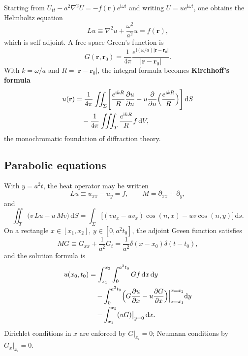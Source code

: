 \begin{example}
Starting from $U_{tt}-a^2\nabla^2 U=-f(\mathbf{r})e^{\mathrm{i}\omega t}$ and writing $U=ue^{\mathrm{i}\omega t}$, one obtains the Helmholtz equation
\begin{equation}
Lu\equiv\nabla^2 u+\frac{\omega^2}{a^2}u=f(\mathbf{r}),
\end{equation}
which is self-adjoint. A free-space Green's function is
\begin{equation}
G(\mathbf{r},\mathbf{r}_0)=\frac{1}{4\pi}\frac{e^{\mathrm{i}(\omega/a)|\mathbf{r}-\mathbf{r}_0|}}{|\mathbf{r}-\mathbf{r}_0|}.
\end{equation}
With $k=\omega/a$ and $R=|\mathbf{r}-\mathbf{r}_0|$, the integral formula becomes \textbf{Kirchhoff's formula}
\begin{equation}
\begin{aligned}
u(\mathbf{r})
&=\frac{1}{4\pi}\iint_{\Sigma}\Biggl[
\frac{e^{\mathrm{i}kR}}{R}\frac{\partial u}{\partial n}
-u\frac{\partial}{\partial n}\Bigl(\frac{e^{\mathrm{i}kR}}{R}\Bigr)
\Biggr]\,\mathrm{d}S\\
&\quad-\frac{1}{4\pi}\iiint_{T}\frac{e^{\mathrm{i}kR}}{R}f\,\mathrm{d}V,
\end{aligned}
\end{equation}
the monochromatic foundation of diffraction theory.
\end{example}

\subsection{Parabolic equations}

With $y=a^2 t$, the heat operator may be written
\begin{equation}
Lu\equiv u_{xx}-u_y=f,
\qquad
M=\partial_{xx}+\partial_y,
\end{equation}
and
\begin{equation}
\iint_{T}\bigl(v\,Lu-u\,Mv\bigr)\,\mathrm{d}S
=\int_{\Sigma}\bigl[(vu_x-uv_x)\cos(n,x)-uv\cos(n,y)\bigr]\,\mathrm{d}s.
\end{equation}
On a rectangle $x\in[x_1,x_2]$, $y\in[0,a^2 t_0]$, the adjoint Green function satisfies
\begin{equation}
MG\equiv G_{xx}+\frac{1}{a^2}G_t
=\frac{1}{a^2}\delta(x-x_0)\delta(t-t_0),
\end{equation}
and the solution formula is
\begin{equation}
\begin{aligned}
u(x_0,t_0)
&=\int_{x_1}^{x_2}\int_0^{a^2 t_0}Gf\,\mathrm{d}x\,\mathrm{d}y\\
&\quad-\int_0^{a^2 t_0}\Bigl(G\frac{\partial u}{\partial x}-u\frac{\partial G}{\partial x}\Bigr)\Big|_{x=x_1}^{x=x_2}\mathrm{d}y\\
&\quad-\int_{x_1}^{x_2}(uG)\big|_{y=0}\,\mathrm{d}x.
\end{aligned}
\end{equation}
Dirichlet conditions in $x$ are enforced by $G|_{x_i}=0$; Neumann conditions by $G_x|_{x_i}=0$.

